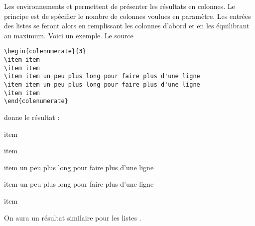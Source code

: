 \documentclass[nocrop]{sesamanuel}
\begin{document}
Les environnements  et 
permettent de présenter les résultats en colonnes. Le principe est de
spécifier le nombre de colonnes voulues en paramètre. Les entrées des
listes se feront alors en remplissant les colonnes d'abord et en les
équilibrant au maximum. Voici un exemple. Le source
\begin{verbatim}
\begin{colenumerate}{3}
\item item
\item item
\item item un peu plus long pour faire plus d'une ligne
\item item un peu plus long pour faire plus d'une ligne
\item item
\end{colenumerate}
\end{verbatim}
donne le résultat :
\begingroup
{}%
\begin{colenumerate}{3}
\item item
\item item
\item item un peu plus long pour faire plus d'une ligne
\item item un peu plus long pour faire plus d'une ligne
\item item
\end{colenumerate}
\endgroup

\strut On aura un résultat similaire pour les listes
.
\end{document}
